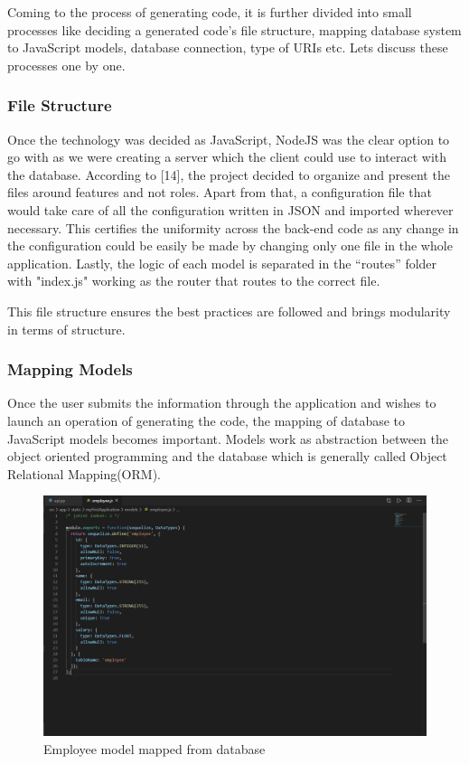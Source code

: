 \documentclass[letterpaper, 10 pt, conference]{ieeeconf}
\begin{document}
Coming to the process of generating code, it is further divided into small processes like deciding a generated code’s file structure, mapping database system to JavaScript models, database connection, type of URIs etc. Lets discuss these processes one by one.
\subsubsection{File Structure}
Once the technology was decided as JavaScript, NodeJS was the clear option to go with as we were creating a server which the client could use to interact with the database. According to [14], the project decided to organize and present the files around features and not roles. Apart from that, a configuration file that would take care of all the configuration written in JSON and imported wherever necessary. This certifies the uniformity across the back-end code as any change in the configuration could be easily be made by changing only one file in the whole application. Lastly, the logic of each model is separated in the “routes” folder with "index.js" working as the router that routes to the correct file.

This file structure ensures the best practices are followed and brings modularity in terms of structure.

\subsubsection{Mapping Models}
Once the user submits the information through the application and wishes to launch an operation of generating the code, the mapping of database to JavaScript models becomes important. Models work as abstraction between the object oriented programming and the database which is generally called Object Relational Mapping(ORM).


\begin{figure}[h]
   \centering
   \includegraphics[scale=0.21]{./fig6.png}
   \caption{Employee model mapped from database}
   \label{fig:my_label}
\end{figure}
\end{document}
